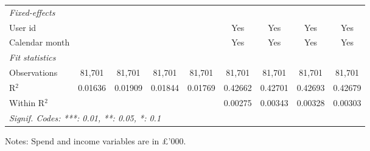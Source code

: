 \begin{table}[htbp]
\begin{threeparttable}[b]
\begin{tabular}{lcccccccc}
         \midrule
         \emph{Fixed-effects}\\
         User id                   &                                &                   &                               &                  & Yes             & Yes              & Yes              & Yes\\  
         Calendar month            &                                &                   &                               &                  & Yes             & Yes              & Yes              & Yes\\  
         \midrule
         \emph{Fit statistics}\\
         Observations              & 81,701                         & 81,701            & 81,701                        & 81,701           & 81,701          & 81,701           & 81,701           & 81,701\\  
         R$^2$                     & 0.01636                        & 0.01909           & 0.01844                       & 0.01769          & 0.42662         & 0.42701          & 0.42693          & 0.42679\\  
         Within R$^2$              &                                &                   &                               &                  & 0.00275         & 0.00343          & 0.00328          & 0.00303\\  
         \midrule \midrule
         \multicolumn{9}{l}{\emph{Signif. Codes: ***: 0.01, **: 0.05, *: 0.1}}\\
      \end{tabular}
      
      \begin{tablenotes}\footnotesize
         \item Notes: Spend and income variables are in \pounds'000.
      \end{tablenotes}
   \end{threeparttable}
\end{table}


